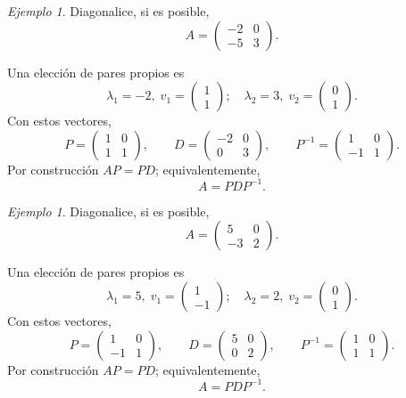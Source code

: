 \documentclass[12pt]{article}
\theoremstyle{remark}
\newtheorem{Ejem}[definicion]{Ejemplo}
\begin{document}
\begin{Ejem}


Diagonalice, si es posible,
\[
A=\begin{pmatrix}-2 & 0\\-5 & 3\end{pmatrix}.
\]

\scriptsize
Una elección de pares propios es
\[
\lambda_1=-2,\;v_1=\begin{pmatrix}1\\1\end{pmatrix};\quad \lambda_2=3,\;v_2=\begin{pmatrix}0\\1\end{pmatrix}.
\]
Con estos vectores,
\[
P=\begin{pmatrix}1 & 0\\1 & 1\end{pmatrix},\qquad D=\begin{pmatrix}-2 & 0\\0 & 3\end{pmatrix},\qquad P^{-1}=\begin{pmatrix}1 & 0\\-1 & 1\end{pmatrix}.
\]
Por construcción $AP=PD$; equivalentemente,
\[
\boxed{A=PDP^{-1}}.
\]

\end{Ejem}

\begin{Ejem}

Diagonalice, si es posible,
\[
A=\begin{pmatrix}5 & 0\\-3 & 2\end{pmatrix}.
\]


\scriptsize
Una elección de pares propios es
\[
\lambda_1=5,\;v_1=\begin{pmatrix}1\\-1\end{pmatrix};\quad \lambda_2=2,\;v_2=\begin{pmatrix}0\\1\end{pmatrix}.
\]
Con estos vectores,
\[
P=\begin{pmatrix}1 & 0\\-1 & 1\end{pmatrix},\qquad D=\begin{pmatrix}5 & 0\\0 & 2\end{pmatrix},\qquad P^{-1}=\begin{pmatrix}1 & 0\\1 & 1\end{pmatrix}.
\]
Por construcción $AP=PD$; equivalentemente,
\[
\boxed{A=PDP^{-1}}.
\]

\end{Ejem}
\end{document}
